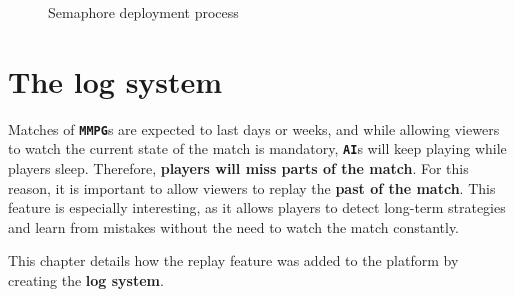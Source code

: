 \documentclass[a4paper,11pt,titlepage,abstract,numbers=noenddot,automark,mnsy,intlimits,rgb,dvipsnames]{report}
\begin{document}
\begin{figure}[H]
\begin{center}
\noindent{}
\end{center}
\caption{Semaphore deployment process}
\label{deployment_process}
\end{figure}
\chapter{The log system}
Matches of \textbf{\texttt{MMPG}}s are expected to last days or weeks, and while allowing viewers to watch the current state of
the match is mandatory, \textbf{\texttt{AI}}s will keep playing while players sleep. Therefore, \textbf{players will miss parts of the match}.
For this reason, it is important to allow viewers to replay the \textbf{past of the match}. This feature is especially
interesting, as it allows players to detect long-term strategies and learn from mistakes without the need to watch the
match constantly.

This chapter details how the replay feature was added to the platform by creating the \textbf{log system}.
\end{document}
